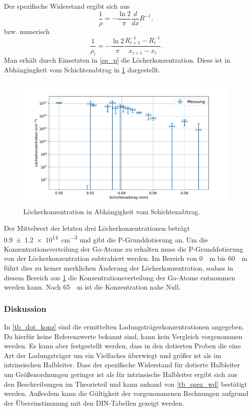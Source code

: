 \documentclass[
	a4paper,
	12pt,
	pagesize,
	ngerman
]{scrartcl}
\begin{document}
	Der spezifische Widerstand ergibt sich aus
	\begin{equation}
		\label{eq_spez_wd_diff}
		\frac{1}{\rho} = - \frac{\ln 2}{\pi} \frac{d}{dx}R^{-1},
	\end{equation}
	bzw. numerisch
	\begin{equation}
		\frac{1}{\rho_i} = - \frac{\ln 2 }{\pi} \frac{R^{-1}_{i+1}-R^{-1}_{i}}{x_{i+1}-x_i}.
	\end{equation}
	Man erhält durch Einsetzten in \cref{eq_p} die Löcherkonzentration.
	Diese ist in Abhängingkeit vom Schichtenabtrag in \cref{fig_polier_konz} dargestellt.

	\begin{figure}[H]
			\includegraphics[width=\linewidth]{img/polier_konz.pdf}
			\caption{
			Löcherkonzentration in Abhängigkeit vom Schichtenabtrag.
							}
			\label{fig_polier_konz}
	\end{figure}

	Der Mittelwert der letzten drei Löcherkonzentrationen beträgt \SI{0.9+-1.2e14}{cm^{-3}} und gibt die P-Grunddotierung an.
	Um die Konzentrationsverteilung der Ga-Atome zu erhalten muss die P-Grunddotierung von der Löcherkonzentration subtrahiert werden.
	Im Bereich von \SI{0}{\mu m} bis \SI{60}{\mu m} führt dies zu keiner merklichen Änderung der Löcherkonzentration, sodass in diesem Bereich aus \cref{fig_polier_konz} die Konzentrationsverteilung der Ga-Atome entnommen werden kann.
	Nach \SI{65}{\mu m} ist die Konzentration nahe Null.

	\subsubsection{Diskussion}
	In \cref{tb_dot_konz} sind die ermittelten Ladungsträgerkonzentrationen angegeben.
	Da hierfür keine Referenzwerte bekannt sind, kann kein Vergleich vorgenommen werden.
	Es kann aber festgestellt werden, dass in den dotierten Proben die eine Art der Ladungsträger um ein Vielfaches überwiegt und größer ist als im intrinsischen Halbleiter.
	Dass der spezifische Widerstand für dotierte Halbleiter um Größenordnungen geringer ist als für intrinsische Halbleiter ergibt sich aus den Beschreibungen im Theorieteil und kann anhand von \cref{tb_spez_wd} bestätigt werden.
	Außerdem kann die Gültigkeit der vorgenommenen Rechnungen aufgrund der Übereinstimmung mit den DIN-Tabellen gezeigt werden. %
\end{document}
